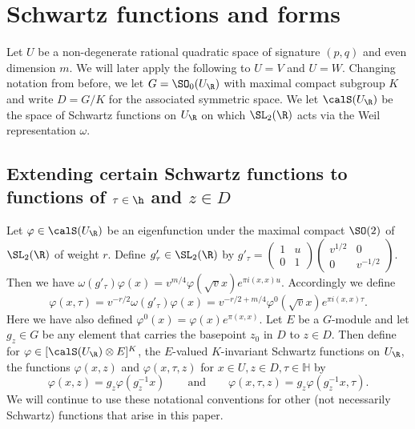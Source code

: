 \section{Schwartz functions and forms}

Let $U$ be a non-degenerate rational quadratic space of  signature
$(p,q)$ and even dimension $m$. We will later apply the following
to $U=V$ and $U=W$. Changing notation from before, we let $G =
\SO_0(U_{\R})$ with maximal compact subgroup $K$ and write $D=G/K$
for the associated symmetric space. We let $\calS(U_{\R})$ be the
space of Schwartz functions on $U_{\R}$ on which $\SL_2(\R)$ acts
via the Weil representation $\omega$.

\subsection{Extending certain Schwartz functions to functions of
$\tau \in \h$ and $z\in D$}\label{conventions}

Let $\varphi \in \calS(U_{\R})$ be an eigenfunction under the maximal
compact $\SO(2)$ of $\SL_2(\R)$ of
weight $r$. Define $g'_{\tau} \in \SL_2(\R)$
by $g'_{\tau} = \left(
\begin{smallmatrix}1&u\\0&1\end{smallmatrix} \right) \left(
\begin{smallmatrix}v^{1/2}&0\\0&v^{-1/2}\end{smallmatrix} \right)$.
Then we have $ \omega(g'_{\tau}) \varphi (x)= v^{m/4} \varphi(\sqrt{v}x) e^{\pi i (x,x)u}$.
Accordingly we define 
\begin{equation}\label{group-tau}
\varphi(x,\tau)  = v^{-r/2} \omega(g'_{\tau}) \varphi
(x)  = v^{-r/2+m/4} \varphi^0(\sqrt{v}x) e^{\pi i (x,x)\tau}.
\end{equation}
Here we have also defined $\varphi^0(x) = \varphi(x) e^{\pi (x,x)}$.
Let $E$ be a $G$-module and let $g_z \in G$ be any element that
carries the basepoint $z_0$ in $D$ to $z \in D$. Then define for
$\varphi \in [\calS(U_{\R}) \otimes E]^K$, the $E$-valued $K$-invariant
Schwartz functions on $U_{\R}$, the functions $\varphi(x,z)$ and
$\varphi(x,\tau,z)$ for $x \in U, z \in D, \tau \in \mathbb{H}$ by
\[
\varphi(x,z) =g_z \varphi(g_z^{-1}x) \qquad  \text{and} \qquad  \varphi(x,\tau,z) = g_z\varphi(g_z^{-1}x,\tau).
\]
We will continue to use these notational conventions for other (not
necessarily Schwartz) functions that arise in this paper.


